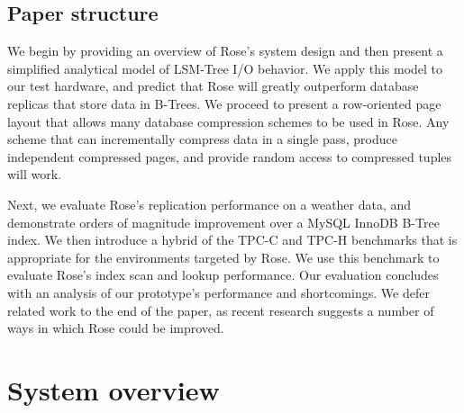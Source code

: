 \documentclass{vldb}
\newcommand{\rows}{Rose\xspace}
\newcommand{\rowss}{Rose's\xspace}
\begin{document}


\subsection{Paper structure}

We begin by providing an overview of \rowss system design and then
present a simplified analytical model of LSM-Tree I/O behavior.  We
apply this model to our test hardware, and predict that \rows will
greatly outperform database replicas that store data in B-Trees.  We
proceed to present a row-oriented page layout that allows many
database compression schemes to be used in \rows.  Any scheme that can
incrementally compress data in a single pass, produce independent
compressed pages, and provide random access to compressed tuples will
work.

Next, we
evaluate \rowss replication performance on a weather data, and
demonstrate orders of magnitude improvement over
a MySQL InnoDB B-Tree index.  We then introduce a hybrid of the
TPC-C and TPC-H benchmarks that is appropriate for the environments
targeted by \rows.  We use this benchmark to evaluate \rowss index scan and lookup performance.  Our evaluation concludes
with an analysis of our prototype's performance and shortcomings.  We
defer related work to the end of the paper, as recent research
suggests a number of ways in which \rows could be improved.

\section{System overview}
\end{document}
